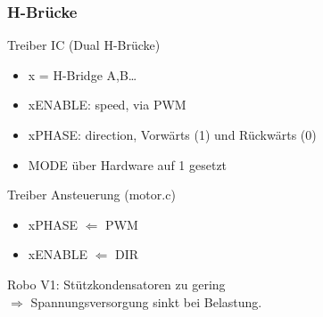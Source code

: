 \documentclass{beamer}
\begin{document}
\begin{frame}
	\frametitle{H-Brücke}

	\begin{block}{Treiber IC (Dual H-Brücke) }
		\begin{itemize}
			\item{x = H-Bridge A,B\dots}
			\item{xENABLE: speed, via PWM}
			\item{xPHASE: direction, Vorwärts (1) und Rückwärts (0)}
			\item{MODE über Hardware auf 1 gesetzt}
		\end{itemize}
	\end{block}


	\begin{block}{Treiber Ansteuerung (motor.c)}
		 \begin{itemize}
	 		\item{xPHASE $\Leftarrow$ PWM}
	 		\item{xENABLE $\Leftarrow$ DIR}
		 \end{itemize}
	\end{block}


	\begin{alertblock}{}
		Robo V1: Stützkondensatoren zu gering\\
		$\Rightarrow$ Spannungsversorgung sinkt bei Belastung.
	\end{alertblock}
\end{frame}
\end{document}

